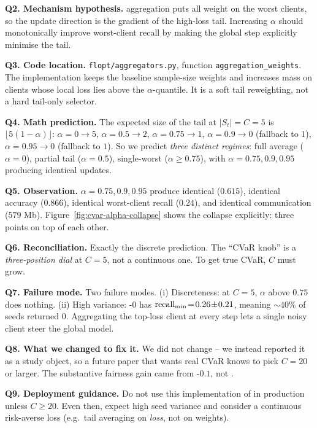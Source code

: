 \textbf{Q2. Mechanism hypothesis.}
\cvar{} aggregation puts all weight on the worst clients, so the
update direction is the gradient of the high-loss tail. Increasing
$\alpha$ should monotonically improve worst-client recall by making
the global step explicitly minimise the tail.

\textbf{Q3. Code location.} \texttt{flopt/aggregators.py},
function \texttt{aggregation\_weights}. The implementation keeps the
baseline sample-size weights and increases mass on clients whose local
loss lies above the $\alpha$-quantile. It is a soft tail reweighting,
not a hard tail-only selector.

\textbf{Q4. Math prediction.}
The expected size of the tail at $|S_t|\!=\!C\!=\!5$ is
$\lfloor 5(1-\alpha) \rfloor$: $\alpha\!=\!0\!\to\!5$,
$\alpha\!=\!0.5\!\to\!2$, $\alpha\!=\!0.75\!\to\!1$,
$\alpha\!=\!0.9\!\to\!0$ (fallback to $1$),
$\alpha\!=\!0.95\!\to\!0$ (fallback to $1$). So we predict
\emph{three distinct regimes}: full average ($\alpha\!=\!0$),
partial tail ($\alpha\!=\!0.5$), single-worst ($\alpha\!\geq\!0.75$),
with $\alpha \!=\! 0.75, 0.9, 0.95$ producing identical updates.

\textbf{Q5. Observation.}
$\alpha\!=\!0.75, 0.9, 0.95$ produce identical \auprc{} ($0.615$),
identical accuracy ($0.866$), identical worst-client recall ($0.24$),
and identical communication ($579$ Mb). Figure~\ref{fig:cvar-alpha-collapse}
shows the collapse explicitly: three points on top of each other.

\textbf{Q6. Reconciliation.}
Exactly the discrete prediction. The ``CVaR knob'' is a
\emph{three-position dial} at $C\!=\!5$, not a continuous one. To get
true CVaR, $C$ must grow.

\textbf{Q7. Failure mode.}
Two failure modes. (i) Discreteness: at $C\!=\!5$, $\alpha$ above
$0.75$ does nothing. (ii) High variance: \cvar{}-$0$ has
$\text{recall}_{\min}{}\!=\!0.26 \!\pm\! 0.21$, meaning $\sim$$40\%$ of seeds
returned $0$. Aggregating the top-loss client at every step lets a
single noisy client steer the global model.

\textbf{Q8. What we changed to fix it.}
We did not change \cvar{} -- we instead reported it as a study object,
so a future paper that wants real CVaR knows to pick $C\!=\!20$ or
larger. The substantive fairness gain came from \fedprox{}-$0.1$, not
\cvar{}.

\textbf{Q9. Deployment guidance.}
Do not use this implementation of \cvar{} in production unless $C \geq
20$. Even then, expect high seed variance and consider a continuous
risk-averse loss (e.g.\ tail averaging on \emph{loss}, not on weights).

